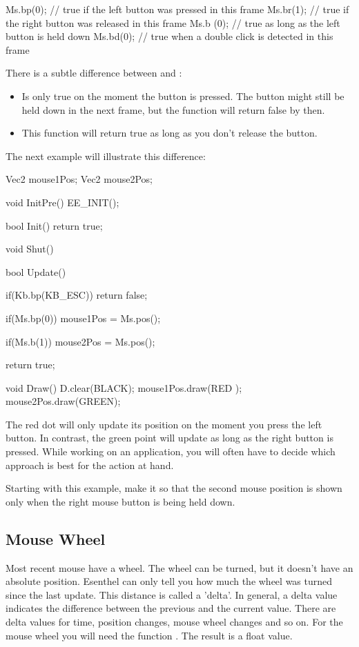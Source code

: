 \begin{code}
Ms.bp(0); // true if the left button was pressed in this frame
Ms.br(1); // true if the right button was released in this frame
Ms.b (0); // true as long as the left button is held down
Ms.bd(0); // true when a double click is detected in this frame
\end{code}

There is a subtle difference between  and :
\begin{itemize}
	\item {} Is only true on the moment the button is pressed. The button might still be held down in the next frame, but the function will return false by then.
	\item {} This function will return true as long as you don't release the button.
\end{itemize}

The next example will illustrate this difference:

\begin{code}
Vec2 mouse1Pos;
Vec2 mouse2Pos;

void InitPre()
{
   EE_INIT();
}

bool Init()
{   
   return true;
}

void Shut() {}

bool Update()
{
   if(Kb.bp(KB_ESC)) return false;
   
   if(Ms.bp(0)) {
      mouse1Pos = Ms.pos();
   }
   
   if(Ms.b(1)) {
      mouse2Pos = Ms.pos();
   }
   
   return true;
}

void Draw()
{
   D.clear(BLACK);
   mouse1Pos.draw(RED  );
   mouse2Pos.draw(GREEN);
}
\end{code}

The red dot will only update its position on the moment you press the left button. In contrast, the green point will update as long as the right button is pressed. While working on an application, you will often have to decide which approach is best for the action at hand.

\begin{exercise}
Starting with this example, make it so that the second mouse position is shown only when the right mouse button is being held down.
\end{exercise} 


\subsection{Mouse Wheel}
Most recent mouse have a wheel. The wheel can be turned, but it doesn't have an absolute position. Esenthel can only tell you how much the wheel was turned since the last update. This distance is called a 'delta'. In general, a delta value indicates the difference between the previous and the current value. There are delta values for time, position changes, mouse wheel changes and so on. For the mouse wheel you will need the function . The result is a float value.

